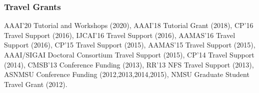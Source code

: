 \subsubsection*{\sc Travel Grants}
	AAAI'20 Tutorial and Workshops (2020), 
	AAAI'18 Tutorial Grant (2018), 
	CP'16 Travel Support (2016), 
	IJCAI'16 Travel Support (2016), 
	AAMAS'16 Travel Support (2016), 
	CP'15 Travel Support (2015), 
	AAMAS'15 Travel Support (2015), 
	AAAI/SIGAI Doctoral Consortium Travel Support (2015), 
  	CP'14 Travel Support (2014), 
  	CMSB'13 Conference Funding (2013), 
  	RR'13 NFS Travel Support (2013), 
  	ASNMSU Conference Funding (2012,2013,2014,2015), 
  	NMSU Graduate Student Travel Grant  (2012).
